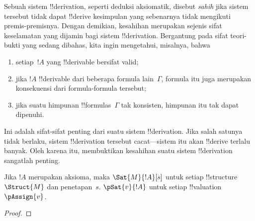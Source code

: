 \documentclass[../../../include/open-logic-section]{subfiles}
\begin{document}
      {}
      {}


\begin{explain}
Sebuah sistem !!{derivation}, seperti deduksi aksiomatik, disebut
\emph{sahih} jika sistem tersebut tidak dapat !!{derive} kesimpulan yang
sebenarnya tidak mengikuti premis-premisnya. Dengan demikian, kesahihan
merupakan sejenis sifat keselamatan yang dijamin bagi sistem
!!{derivation}. Bergantung pada sifat teori-bukti yang sedang dibahas,
kita ingin mengetahui, misalnya, bahwa
\begin{enumerate}
\item setiap~$!A$ yang !!{derivable} bersifat valid;
\item jika $!A$ !!{derivable} dari beberapa formula lain~$\Gamma$,
  formula itu juga merupakan konsekuensi dari formula-formula tersebut;
\item jika suatu himpunan !!{formula}s~$\Gamma$ tak konsisten, himpunan
  itu tak dapat dipenuhi.
\end{enumerate}
Ini adalah sifat-sifat penting dari suatu sistem !!{derivation}. Jika
salah satunya tidak berlaku, sistem !!{derivation} tersebut cacat---sistem
itu akan !!{derive} terlalu banyak. Oleh karena itu, membuktikan kesahihan
suatu sistem !!{derivation} sangatlah penting.
\end{explain}

\begin{prop}
  Jika $!A$ merupakan aksioma, maka
    {$\Sat{M}{!A}[s]$ untuk setiap !!{structure}~$\Struct{M}$ dan
      penetapan~$s$.}
    {$\pSat{v}{!A}$ untuk setiap !!{valuation}~$\pAssign{v}$.}
\end{prop}

\begin{proof}
\end{proof}
\end{document}
